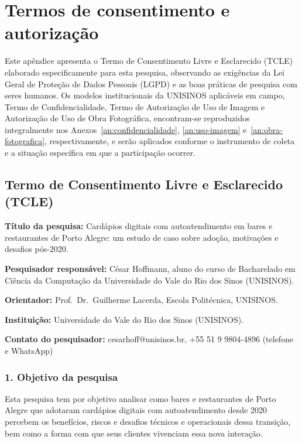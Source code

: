 \chapter{Termos de consentimento e autorização}
\label{ap:termos}

Este apêndice apresenta o Termo de Consentimento Livre e Esclarecido (TCLE) elaborado especificamente para esta pesquisa, observando as exigências da Lei Geral de Proteção de Dados Pessoais (LGPD) e as boas práticas de pesquisa com seres humanos. Os modelos institucionais da UNISINOS aplicáveis em campo, Termo de Confidencialidade, Termo de Autorização de Uso de Imagem e Autorização de Uso de Obra Fotográfica, encontram-se reproduzidos integralmente nos Anexos~\ref{an:confidencialidade}, \ref{an:uso-imagem} e~\ref{an:obra-fotografica}, respectivamente, e serão aplicados conforme o instrumento de coleta e a situação específica em que a participação ocorrer.

\section*{Termo de Consentimento Livre e Esclarecido (TCLE)}

\noindent\textbf{Título da pesquisa:} Cardápios digitais com autoatendimento em bares e restaurantes de Porto Alegre: um estudo de caso sobre adoção, motivações e desafios pós-2020.

\noindent\textbf{Pesquisador responsável:} César Hoffmann, aluno do curso de Bacharelado em Ciência da Computação da Universidade do Vale do Rio dos Sinos (UNISINOS).

\noindent\textbf{Orientador:} Prof.\ Dr.\ Guilherme Lacerda, Escola Politécnica, UNISINOS.

\noindent\textbf{Instituição:} Universidade do Vale do Rio dos Sinos (UNISINOS).

\noindent\textbf{Contato do pesquisador:} cesarhoff@unisinos.br, +55 51 9 9804-4896 (telefone e WhatsApp)

\subsection*{1. Objetivo da pesquisa}

Esta pesquisa tem por objetivo analisar como bares e restaurantes de Porto Alegre que adotaram cardápios digitais com autoatendimento desde 2020 percebem os benefícios, riscos e desafios técnicos e operacionais dessa transição, bem como a forma com que seus clientes vivenciam essa nova interação.

